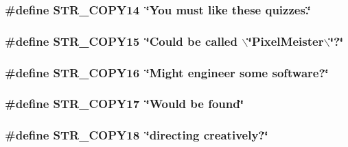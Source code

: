 \label{F__SPEAR_8H_a2ca7ffeb121c4599e89e9dc7d72c78cc}
\hypertarget{F__SPEAR_8H_a93713b4d54e91a2c3ce5f25e1dcc5100}{
\subsubsection[{STR\_\-COPY14}]{\setlength{\rightskip}{0pt plus 5cm}\#define STR\_\-COPY14~\char`\"{}You must like these quizzes.\char`\"{}}}
\label{F__SPEAR_8H_a93713b4d54e91a2c3ce5f25e1dcc5100}
\hypertarget{F__SPEAR_8H_a51f99112bb6e4498607543fd51d59aca}{
\subsubsection[{STR\_\-COPY15}]{\setlength{\rightskip}{0pt plus 5cm}\#define STR\_\-COPY15~\char`\"{}Could be called $\backslash$\char`\"{}PixelMeister$\backslash$\char`\"{}?\char`\"{}}}
\label{F__SPEAR_8H_a51f99112bb6e4498607543fd51d59aca}
\hypertarget{F__SPEAR_8H_a0735ea9de5590a809ddf86b0101908fe}{
\subsubsection[{STR\_\-COPY16}]{\setlength{\rightskip}{0pt plus 5cm}\#define STR\_\-COPY16~\char`\"{}Might engineer some software?\char`\"{}}}
\label{F__SPEAR_8H_a0735ea9de5590a809ddf86b0101908fe}
\hypertarget{F__SPEAR_8H_a818918baaa915d6d517a40d63a9e3caf}{
\subsubsection[{STR\_\-COPY17}]{\setlength{\rightskip}{0pt plus 5cm}\#define STR\_\-COPY17~\char`\"{}Would be found\char`\"{}}}
\label{F__SPEAR_8H_a818918baaa915d6d517a40d63a9e3caf}
\hypertarget{F__SPEAR_8H_acde25f14c0f0cc4649a9c6767e5fed67}{
\subsubsection[{STR\_\-COPY18}]{\setlength{\rightskip}{0pt plus 5cm}\#define STR\_\-COPY18~\char`\"{}directing creatively?\char`\"{}}}
